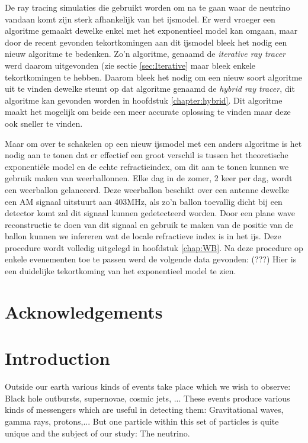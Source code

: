 \documentclass[11pt,a4paper,faculty=we,language=en,doctype=report]{cls/ugent-doc}
\begin{document}
De ray tracing simulaties die gebruikt worden om na te gaan waar de neutrino
vandaan komt zijn sterk afhankelijk van het ijsmodel.  Er werd vroeger een
algoritme gemaakt dewelke enkel met het exponentieel model kan omgaan, maar
door de recent gevonden tekortkomingen aan dit ijsmodel bleek het nodig een
nieuw algoritme te bedenken. Zo'n algoritme, genaamd de \textit{iterative ray
tracer} werd daarom uitgevonden (zie sectie \ref{sec:Iterative} maar bleek
enkele tekortkomingen te hebben. Daarom bleek het nodig om een nieuw soort
algoritme uit te vinden dewelke steunt op dat algoritme genaamd de
\textit{hybrid ray tracer}, dit algoritme kan gevonden worden in hoofdstuk
\ref{chapter:hybrid}. Dit algoritme maakt het mogelijk om beide een meer
accurate oplossing te vinden maar deze ook sneller te vinden.

Maar om over te schakelen op een nieuw ijsmodel met een anders algoritme is het nodig aan te tonen dat er effectief
een groot verschil is tussen het theoretische exponentiële model en de echte refractieindex, om dit aan te tonen 
kunnen we gebruik maken van weerballonnen. Elke dag in de zomer, 2 keer per dag, wordt een weerballon gelanceerd. 
Deze weerballon beschikt over een antenne dewelke een AM signaal uitstuurt aan 403MHz, als zo'n ballon toevallig
dicht bij een detector komt zal dit signaal kunnen gedetecteerd worden. Door een plane wave reconstructie te doen
van dit signaal en gebruik te maken van de positie van de ballon kunnen we infereren wat de locale refractieve index
is in het ijs. Deze procedure wordt volledig uitgelegd in hoofdstuk \ref{chap:WB}.
Na deze procedure op enkele evenementen toe te passen werd de volgende data gevonden:
(???)
Hier is een duidelijke tekortkoming van het exponentieel model te zien.
\newpage
\chapter*{Acknowledgements}
\newpage
{\hypersetup{hidelinks}\tableofcontents} %
\newpage


\chapter*{Introduction}
Outside our earth various kinds of events take place which we wish to 
observe: Black hole outbursts, supernovae, cosmic jets, ...
These events produce various kinds of messengers which are useful in
detecting them: Gravitational waves, gamma rays, protons,...
But one particle within this set of particles is quite unique and
the subject of our study: The neutrino. 
\end{document}
